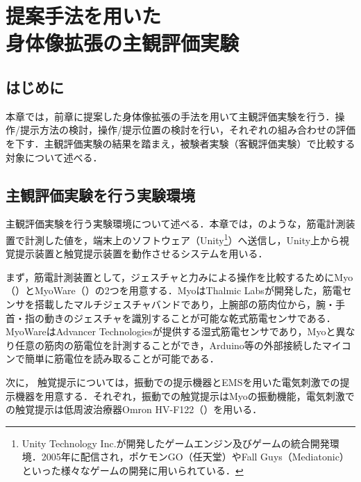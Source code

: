 \chapter[提案手法を用いた身体像拡張の主観評価実験]%
        {提案手法を用いた\\身体像拡張の主観評価実験}

\section{はじめに}
    本章では，前章に提案した身体像拡張の手法を用いて主観評価実験を行う．操作/提示方法の検討，操作/提示位置の検討を行い，それぞれの組み合わせの評価を下す．主観評価実験の結果を踏まえ，被験者実験（客観評価実験）で比較する対象について述べる．

\section{主観評価実験を行う実験環境}

    主観評価実験を行う実験環境について述べる．本章では，のような，筋電計測装置で計測した値を，端末上のソフトウェア（Unity\footnote{Unity Technology Inc.が開発したゲームエンジン及びゲームの統合開発環境．2005年に配信され，ポケモンGO（任天堂）やFall Guys（Mediatonic）といった様々なゲームの開発に用いられている．}）へ送信し，Unity上から視覚提示装置と触覚提示装置を動作させるシステムを用いる．


    まず，筋電計測装置として，ジェスチャと力みによる操作を比較するためにMyo（）\cite{thalmiclabs}とMyoWare（）\cite{advancertechnologies}の2つを用意する．MyoはThalmic Labsが開発した，筋電センサを搭載したマルチジェスチャバンドであり，上腕部の筋肉位から，腕・手首・指の動きのジェスチャを識別することが可能な乾式筋電センサである．MyoWareはAdvancer Technologiesが提供する湿式筋電センサであり，Myoと異なり任意の筋肉の筋電位を計測することができ，Arduino等の外部接続したマイコンで簡単に筋電位を読み取ることが可能である．

    次に，
    触覚提示については，振動での提示機器とEMSを用いた電気刺激での提示機器を用意する．それぞれ，振動での触覚提示はMyoの振動機能，電気刺激での触覚提示は低周波治療器Omron HV-F122（）\cite{Omron-HV-F122}を用いる．

